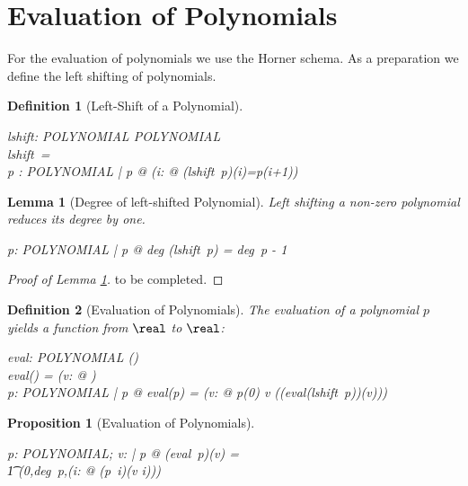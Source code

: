 \documentclass[12pt]{scrartcl}
\newtheorem{prop}{Proposition}[section]
\newtheorem{lemma}{Lemma}[section]
\newtheorem{zdef}{Definition}[section]
\begin{document}
\section{Evaluation of Polynomials}
\label{sec:evaluation}

For the evaluation of polynomials we use the Horner schema. As a
preparation we define the left shifting of polynomials.
 
\begin{zdef}[Left-Shift of a Polynomial]
  \label{zdef:left-shift}
  \begin{axdef}
    lshift: POLYNOMIAL \fun POLYNOMIAL \\
    \where
    lshift~\zeropol = \zeropol\\
    \forall p : POLYNOMIAL | p \neq \zeropol @ (\forall i: \nat @ (lshift~p)(i)=p(i+1))
  \end{axdef}
\end{zdef}

\begin{lemma}[Degree of left-shifted Polynomial]
  \label{lemma:degree-left-shift}
  Left shifting a non-zero polynomial reduces its degree by one.
  \begin{zed}
    \forall p: POLYNOMIAL | p \neq \zeropol @ deg (lshift~p) = deg~p - 1
  \end{zed}
\end{lemma}

\begin{proof}[Proof of Lemma \ref{lemma:degree-left-shift}]
  to be completed.
\end{proof}

\begin{zdef}[Evaluation of Polynomials]
  \label{zdef:evaluation}
  The evaluation of a polynomial $p$ yields a function from $\real$ to
  $\real$:
  \begin{axdef}
    eval: POLYNOMIAL \fun (\real \fun \real)\\
    \where
    eval(\zeropol) = (\lambda v: \real @ \azero)\\
    \forall p: POLYNOMIAL | p \neq \zeropol @ eval(p) = (\lambda v:
    \real @ p(0) \aplus v \amult ((eval(lshift~p))(v)))
  \end{axdef}
\end{zdef}


\begin{prop}[Evaluation of Polynomials]
  \label{prop:evalutation}
  \begin{zed}
    \forall p: POLYNOMIAL; v: \real | p \neq \zeropol @ (eval~p)(v) = \\
    \t1 \finsum(0,deg~p,(\lambda i: \nat @ (p~i)\amult(v \apwr i)))
  \end{zed}
\end{prop}
\end{document}
